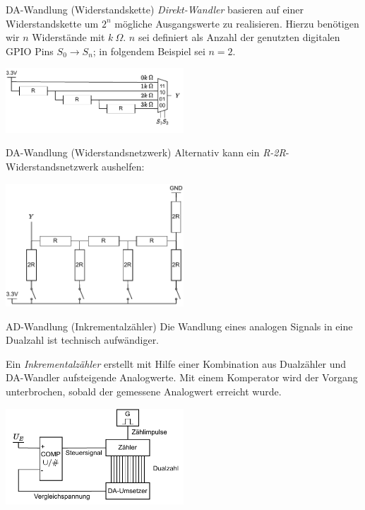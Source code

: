 \begin{defi}{DA-Wandlung (Widerstandskette)}
    \emph{Direkt-Wandler} basieren auf einer Widerstandskette um $2^n$ mögliche Ausgangswerte zu realisieren.
    Hierzu benötigen wir $n$ Widerstände mit $k \ \Omega$.
    $n$ sei definiert als Anzahl der genutzten digitalen GPIO Pins $S_0 \to S_n$; in folgendem Beispiel sei $n = 2$.

    \begin{center}
        \includegraphics[width=0.5\textwidth]{includes/figures/defi_da_chain.pdf}
    \end{center}
\end{defi}

\begin{defi}{DA-Wandlung (Widerstandsnetzwerk)}
    Alternativ kann ein \emph{R-2R}-Widerstandsnetzwerk aushelfen:

    \begin{center}
        \includegraphics[width=0.5\textwidth]{includes/figures/defi_da_network.pdf}
    \end{center}
\end{defi}

\begin{defi}{AD-Wandlung (Inkrementalzähler)}
    Die Wandlung eines analogen Signals in eine Dualzahl ist technisch aufwändiger.

    Ein \emph{Inkrementalzähler} erstellt mit Hilfe einer Kombination aus Dualzähler und DA-Wandler aufsteigende Analogwerte.
    Mit einem Komperator wird der Vorgang unterbrochen, sobald der gemessene Analogwert erreicht wurde.

    \begin{center}
        \includegraphics[width=0.5\textwidth]{includes/figures/defi_ad_inkrementalumsetzer.pdf}
    \end{center}
\end{defi}


